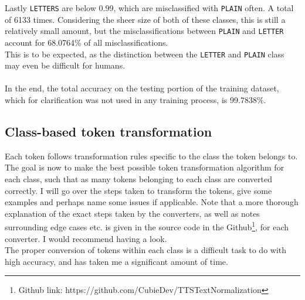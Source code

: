 \documentclass[a4paper, 9pt]{extarticle}
\newcommand{\code}{\texttt}
\begin{document}
Lastly \code{LETTERS} are below 0.99, which are misclassified with \code{PLAIN} often. A total of 6133 times. Considering the sheer size of both of these classes, this is still a relatively small amount, but the misclassifications between \code{PLAIN} and \code{LETTER} account for 68.0764\% of all misclassifications.\\
This is to be expected, as the distinction between the \code{LETTER} and \code{PLAIN} class may even be difficult for humans.\\
\\
In the end, the total accuracy on the testing portion of the training dataset, which for clarification was not used in any training process, is 99.7838\%.

\subsection{Class-based token transformation}
Each token follows transformation rules specific to the class the token belongs to. The goal is now to make the best possible token transformation algorithm for each class, such that as many tokens belonging to each class are converted correctly. I will go over the steps taken to transform the tokens, give some examples and perhaps name some issues if applicable. Note that a more thorough explanation of the exact steps taken by the converters, as well as notes surrounding edge cases etc. is given in the source code in the Github\footnote{Github link: https://github.com/CubieDev/TTSTextNormalization}, for each converter. I would recommend having a look.\\
The proper conversion of tokens within each class is a difficult task to do with high accuracy, and has taken me a significant amount of time. 
\end{document}
